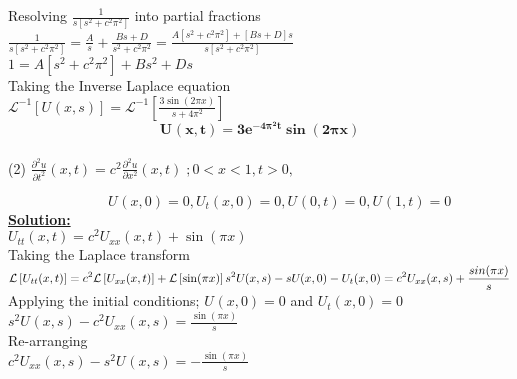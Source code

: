 \documentclass[a4paper 11pt]{article}
\newcommand{\Laplace}{\mathcal{L}}
\newcommand{\sbracket}[1]{\left[#1\right]}
\newcommand{\Un}[2]{U_{#1}(#2)}
\newcommand{\NI}{\noindent}
\newcommand{\psq}{\pi^{2}}
\newcommand{\InverseL}[1]{\Laplace^{-1}\left[#1\right]}
\newcommand{\LT}[1]{\Laplace \left[#1\right]}
\begin{document}
\NI Resolving $\displaystyle \frac{1}{s\sbracket{s^{2} + c^{2}\psq}}$ into partial fractions \\[0.2cm]
$\displaystyle
\frac{1}{s\sbracket{s^{2} + c^{2}\psq}} = \frac{A}{s} + \frac{Bs + D}{s^{2} + c^{2}\psq} = \frac{A\sbracket{s^2 + c^2 \psq} + \sbracket{Bs + D}s}{s\sbracket{s^2 + c^2 \psq}}
$\\[0.3cm]
$\displaystyle
1 = A \sbracket{s^2 + c^2 \psq} + Bs^2 + Ds
$\\[0.3cm]

\NI Taking the Inverse Laplace equation\\[0.2cm]
$\displaystyle
\InverseL{\Un{}{x,s}} = \InverseL{\frac{3\sin(2\pi x)}{s + 4\psq}}
$\\[0.3cm]

$$ \mathbf{
\Un{}{x,t} = 3e^{-4\psq t}\sin(2\pi x)}
$$
\\[0.5cm]
\NI (2) $\displaystyle \frac{\partial^2 u}{\partial t^2}(x,t) = c^2 \frac{\partial^2 u}{\partial x^2}(x,t) \; ; 0<x<1, t > 0, $

$\hspace{3cm} \displaystyle \Un{}{x,0} = 0, \Un{t}{x,0} = 0,  \Un{}{0,t} = 0,  \Un{}{1,t} = 0$\\

\NI \underline{\textbf{Solution:}} \\[0.2cm]
$\displaystyle \Un{tt}{x,t} = c^2 \Un{xx}{x,t} + \sin(\pi x) $\\[0.2cm]

\NI Taking the Laplace transform \\[0.2cm]
$\displaystyle
\LT{\Un{tt}{x,t}} = c^2 \LT{\Un{xx}{x,t}} + \LT{\sin(\pi x)} \\[0.1cm]
s^2 \Un{}{x,s} - s\Un{}{x,0} - \Un{t}{x,0} = c^2 \Un{xx}{x,s} + \frac{sin(\pi x)}{s}
$\\[0.2cm]

\NI Applying the initial conditions; $\Un{}{x,0} = 0$ and $\Un{t}{x,0} = 0 $ \\[0.2cm]
$\displaystyle
s^2\Un{}{x,s} - c^2 \Un{xx}{x,s} = \frac{\sin(\pi x)}{s}
$\\[0.2cm]

\NI Re-arranging \\[0.2cm]
$\displaystyle
c^2 \Un{xx}{x,s} - s^2 \Un{}{x,s} = - \frac{\sin(\pi x)}{s}
$\\[0.2cm]
\end{document}
